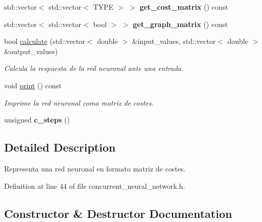 \begin{DoxyCompactItemize}
std\+::vector$<$ std\+::vector$<$ T\+Y\+PE $>$ $>$ {\bfseries get\+\_\+cost\+\_\+matrix} () const
\item 
\mbox{\label{classconcurrent__neural__network_ae988d079e4f402c1b28b6634339cfaa7}} 
std\+::vector$<$ std\+::vector$<$ bool $>$ $>$ {\bfseries get\+\_\+graph\+\_\+matrix} () const
\item 
bool \mbox{\hyperlink{classconcurrent__neural__network_ab3df0ad8df7bb93cc3caca1d0e28e79f}{calculate}} (std\+::vector$<$ double $>$ \&input\+\_\+values, std\+::vector$<$ double $>$ \&output\+\_\+values)
\begin{DoxyCompactList}\small\item\em Calcula la respuesta de la red neuronal ante una entrada. \end{DoxyCompactList}\item 
\mbox{\label{classconcurrent__neural__network_a0e1cdef29d52edde39808ce54bb309a9}} 
void \mbox{\hyperlink{classconcurrent__neural__network_a0e1cdef29d52edde39808ce54bb309a9}{print}} () const
\begin{DoxyCompactList}\small\item\em Imprime la red neuronal como matriz de costes. \end{DoxyCompactList}\item 
\mbox{\label{classconcurrent__neural__network_a91262b8a313f2bdf96472221197b7d12}} 
unsigned {\bfseries c\+\_\+steps} ()
\end{DoxyCompactItemize}


\subsection{Detailed Description}
Representa una red neuronal en formato matriz de costes. 

Definition at line 44 of file concurrent\+\_\+neural\+\_\+network.\+h.



\subsection{Constructor \& Destructor Documentation}
\mbox{\label{classconcurrent__neural__network_ae6b889b695e5959b4265653235d54971}} 
